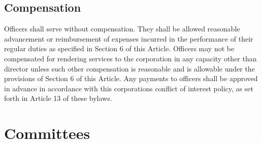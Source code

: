 \documentclass{article}
\begin{document}
	\subsection{Compensation}
	Officers shall serve without compensation. They shall be allowed reasonable advancement or reimbursement of expenses incurred in the performance of their regular duties as specified in Section 6 of this Article. Officers may not be compensated for rendering services to the corporation in any capacity other than director unless such other compensation is reasonable and is allowable under the provisions of Section 6 of this Article. Any payments to officers shall be approved in advance in accordance with this corporation\textquotesingle s conflict of interest policy, as set forth in Article 13 of these bylaws.
	
	\section{Committees}
\end{document}
